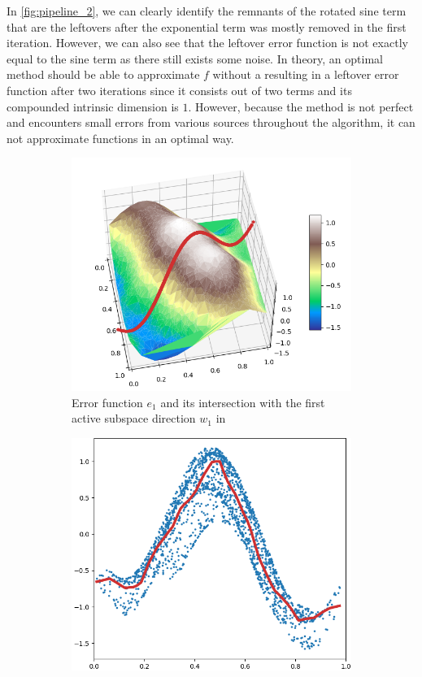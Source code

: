 \documentclass[
  a4paper,  %
  twoside,  %
  bibliography=totoc,
  headsepline,
  cleardoublepage=empty,
  parskip=half,
  draft=false
]{scrbook}
\begin{document}
%
In \cref{fig:pipeline_2}, we can clearly identify the remnants of the rotated sine term that are the leftovers after the exponential term was mostly removed in the first iteration.
However, we can also see that the leftover error function is not exactly equal to the sine term as there still exists some noise.
In theory, an optimal method should be able to approximate $f$ without a resulting in a leftover error function after two iterations since it consists out of two terms and its compounded intrinsic dimension is $1$.
However, because the method is not perfect and encounters small errors from various sources throughout the algorithm, it can not approximate functions in an optimal way.
\begin{mdframed}[style=style]
\begin{figure}[H]
\begin{subfigure}{.5\textwidth}
  \centering
  \includegraphics[width=.8\linewidth]{graphics/pipeline_current_2.png}
  \caption{Error function $e_1$ and its intersection with the first active subspace direction $w_1$ in \reddot}
\label{fig:pipeline_current_2}
\end{subfigure}%
\begin{subfigure}{.5\textwidth}
  \centering
  \includegraphics[width=.8\linewidth]{graphics/pipeline_local_2.png}

\end{subfigure}
\end{figure}
\end{mdframed}
\end{document}
